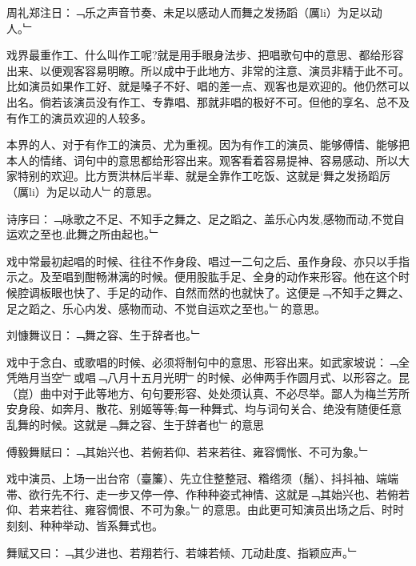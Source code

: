\documentclass{zhvt-classic}
\begin{document}
\begin{preface}
  周礼郑注日：﹁乐之声音节奏、未足以感动人而舞之发扬蹈（厲li）为足以动人。﹂
\end{preface}

戏界最重作工、什么叫作工呢?就是用手眼身法步、把唱歌句中的意思、都给形容出来、以便观客容易明瞭。所以成中于此地方、非常的注意、演员非精于此不可。比如演员如果作工好、就是嗓子不好、唱的差一点、观客也是欢迎的。他仍然可以出名。倘若该演员没有作工、专靠唱、那就非唱的极好不可。但他的享名、总不及有作工的演员欢迎的人较多。

本界的人、对于有作工的演员、尤为重视。因为有作工的演员、能够傅情、能够把本人的情绪、词句中的意思都给形容出来。观客看着容易提神、容易感动、所以大家特别的欢迎。比方贾洪林后半辈、就是全靠作工吃饭、这就是‘舞之发扬蹈厉（厲li）为足以动人﹂的意思。

\begin{preface}
  诗序曰：﹁咏歌之不足、不知手之舞之、足之蹈之、盖乐心内发,感物而动,不觉自运欢之至也.此舞之所由起也。﹂
\end{preface}

戏中常最初起唱的时候、往往不作身段、唱过一二句之后、虽作身段、亦只以手指示之。及至唱到酣畅淋漓的时候。便用股肱手足、全身的动作来形容。他在这个时候腔调板眼也快了、手足的动作、自然而然的也就快了。这便是﹁不知手之舞之、足之蹈之、乐心内发、感物而动、不觉自运欢之至也。﹂的意思。

\begin{preface}
  刘慷舞议日：﹁舞之容、生于辞者也。﹂
\end{preface}

戏中于念白、或歌唱的时候、必须将制句中的意思、形容出来。如武家坡说：﹁全凭皓月当空﹂或唱﹁八月十五月光明﹂的时候、必伸两手作圆月式、以形容之。昆（崑）曲中对于此等地方、句句要形容、处处须认真、不必尽举。鄙人为梅兰芳所安身段、如奔月、散花、别姬等等;每一种舞式、均与词句关合、绝没有随便任意乱舞的时候。这就是﹁舞之容、生于辞者也﹂的意思

\begin{preface}
  傅毅舞赋曰：﹁其始兴也、若俯若仰、若来若往、雍容惆怅、不可为象。﹂
\end{preface}

戏中演员、上场一出台帘（臺簾）、先立住整整冠、糌绺须（鬚）、抖抖袖、端端帯、欲行先不行、走一步又停一停、作种种姿式神情、这就是﹁其始兴也、若俯若仰、若来若往、雍容惆恨、不可为象。﹂的意思。由此更可知演员出场之后、时时刻刻、种种举动、皆系舞式也。

\begin{preface}
  舞赋又曰：﹁其少进也、若翔若行、若竦若倾、兀动赴度、指颖应声。﹂
\end{preface}
\end{document}
